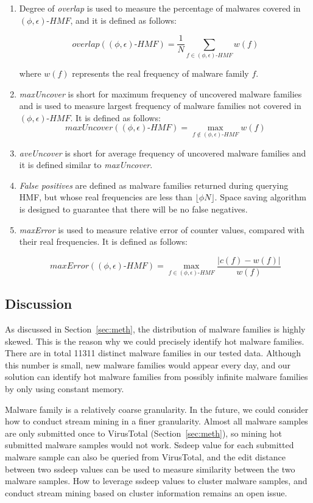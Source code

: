 \begin{enumerate}

\item Degree of \textit{overlap} is used to measure the percentage of malwares covered in $(\phi, \epsilon)\mbox{-}HMF$,
and it is defined as follows:

$$overlap((\phi, \epsilon)\mbox{-}HMF) = \dfrac{1}{N}\sum_{f \in (\phi, \epsilon)\mbox{-}HMF}w(f)$$

where $w(f)$ represents the real frequency of malware family $f$.  

\item \textit{maxUncover} is short for maximum frequency of uncovered malware families and 
is used 
to measure largest frequency of malware families not covered in $(\phi, \epsilon)\mbox{-}HMF$. 
It is defined as follows:
$$maxUncover((\phi, \epsilon)\mbox{-}HMF) = \max_{f \notin (\phi, \epsilon)\mbox{-}HMF}w(f)$$

\item \textit{aveUncover} is short for average frequency of uncovered malware families 
and it is defined similar to \textit{maxUncover}. 

\item \textit{False positives} are defined as malware families returned during querying HMF, 
but whose real frequencies are less than $\lfloor \phi N \rfloor$. 
Space saving algorithm is designed to guarantee that there will be no false negatives. 

\item \textit{maxError} is used to measure relative error of counter values, 
compared with their real frequencies.
It is defined as follows:

$$maxError((\phi, \epsilon)\mbox{-}HMF) = \max_{f \in (\phi, \epsilon)\mbox{-}HMF} \dfrac{\left|c(f) - w(f)\right|}{w(f)}$$


\end{enumerate}



\subsection{Discussion}


As discussed in Section~\ref{sec:meth}, 
the distribution of malware families is highly skewed. 
This is the reason why we could precisely identify hot malware families. 
There are in total 11311 distinct malware families in our tested data. 
Although this number is small, new malware families would appear every day, 
and our solution can identify hot malware families from possibly 
infinite malware families by only using constant memory. 

Malware family is a relatively coarse granularity. 
In the future, we could consider how to conduct stream mining in a finer granularity. 
Almost all malware samples are only submitted once to VirusTotal (Section~\ref{sec:meth}), 
so mining hot submitted malware samples would not work. 
Ssdeep value for each submitted malware sample can also be queried from VirusTotal, 
and the edit distance between two ssdeep values can be used to measure similarity between the two malware samples. 
How to leverage ssdeep values to cluster malware samples, 
and conduct stream mining based on cluster information remains an open issue.  
